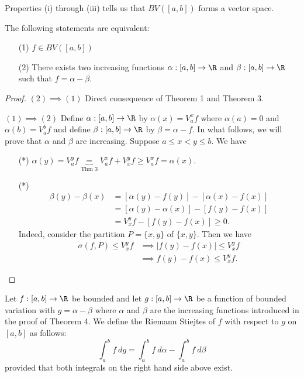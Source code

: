 Properties (i) through (iii) tells us that \( BV([a,b]) \) forms a vector space.

\begin{theorem}
    The following statements are equivalent:
    \begin{enumerate}
        \item[(1)] \( f \in BV([a,b]) \)
        \item[(2)] There exists two increasing functions \( \alpha : [a,b] \to \R  \) and \( \beta : [a,b]  \to \R \) such that \( f = \alpha - \beta \).
    \end{enumerate}
\end{theorem}
\begin{proof}
\( (2) \implies (1) \) Direct consequence of Theorem 1 and Theorem 3.

\( (1) \implies (2) \) Define \( \alpha: [a,b] \to \R  \) by \( \alpha(x) = {V}_{a}^{x} f  \) where \( \alpha(a)  = 0  \) and \( \alpha(b) = {V}_{a}^{b} f  \) and define \( \beta : [a,b] \to \R  \) by \( \beta = \alpha - f  \). In what follows, we will prove that \( \alpha \) and \( \beta \) are increasing. Suppose \( a \leq x < y \leq b  \). We have 
\begin{enumerate}
    \item[(*)] \( \alpha(y) = {V}_{a}^{y} f \underbrace{=}_{\text{Thm 3}} {V}_{a}^{x} f + {V}_{x}^{y} f \geq {V}_{a}^{x} f = \alpha(x).  \)
    \item[(*)] \begin{align*}
            \beta(y) - \beta(x) &= [\alpha(y) - f(y)] - [\alpha(x) - f(x)] \\
                                &= [\alpha(y) - \alpha(x)] - [f(y) - f(x)] \\
                                &= {V}_{x}^{y} f - [f(y) - f(x)] \geq 0. 
        \end{align*}
        Indeed, consider the partition \( P= \{  x,y  \}   \) of \( \{ x,y \}  \). Then we have  
        \begin{align*}
            \sigma(f,P) \leq {V}_{x}^{y} f &\implies | f(y) - f(x) |  \leq {V}_{x}^{y} f  \\
                                           &\implies f(y) - f(x) \leq {V}_{x}^{y} f. 
        \end{align*} 
\end{enumerate}
\end{proof}

\begin{definition}
    Let \( f:[a,b] \to \R  \) be bounded and let \( g: [a,b] \to \R  \) be a function of bounded variation with \( g = \alpha - \beta \) where \( \alpha \) and \( \beta \) are the increasing functions introduced in the proof of Theorem 4. We define the Riemann Stiejtes of \( f  \) with respect to \( g  \) on \( [a,b] \) as follows:
    \[  \int_{ a }^{ b }  f  \ dg = \int_{ a }^{ b }  f  \ d \alpha - \int_{ a }^{ b }  f  \ d \beta \]
    provided that both integrals on the right hand side above exist.
\end{definition}

